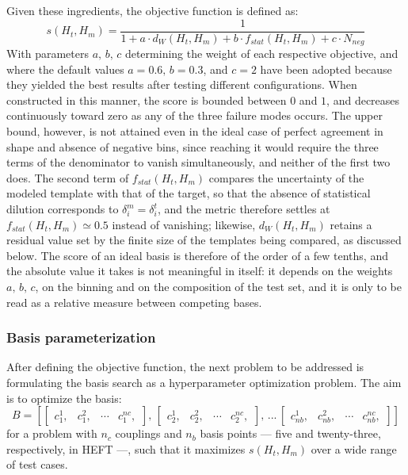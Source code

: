 Given these ingredients, the objective function is defined as:
\begin{equation}
\label{eq:scorefunc}
    s(H_{t},H_{m})=\frac{1}{1+a\cdot d_W(H_{t},H_{m}) + b\cdot f_{stat}(H_{t},H_{m}) + c\cdot N_{neg}}
\end{equation}
With parameters $a,\,b,\,c$ determining the weight of each respective objective, and where the default values $a=0.6,\,b=0.3$, and $c=2$ have been adopted because they yielded the best results after testing different configurations. When constructed in this manner, the score is bounded between $0$ and $1$, and decreases continuously toward zero as any of the three failure modes occurs. The upper bound, however, is not attained even in the ideal case of perfect agreement in shape and absence of negative bins, since reaching it would require the three terms of the denominator to vanish simultaneously, and neither of the first two does. The second term of $f_{stat}(H_{t},H_{m})$ compares the uncertainty of the modeled template with that of the target, so that the absence of statistical dilution corresponds to $\delta_i^{m}=\delta_i^{t}$, and the metric therefore settles at $f_{stat}(H_{t},H_{m})\simeq0.5$ instead of vanishing; likewise, $d_W(H_{t},H_{m})$ retains a residual value set by the finite size of the templates being compared, as discussed below. The score of an ideal basis is therefore of the order of a few tenths, and the absolute value it takes is not meaningful in itself: it depends on the weights $a,\,b,\,c$, on the binning and on the composition of the test set, and it is only to be read as a relative measure between competing bases.\\

\subsubsection{Basis parameterization}
%
After defining the objective function, the next problem to be addressed is formulating the basis search as a hyperparameter optimization problem. The aim is to optimize the basis:
%
\begin{equation}
 B=\left[ \begin{bmatrix}  c_1^{1},  & c_1^{2},  & \cdots & c_1^{nc}, \end{bmatrix},\, \begin{bmatrix}  c_2^{1},  & c_2^{2},  & \cdots & c_2^{nc},  \end{bmatrix},\, ...\, \begin{bmatrix}  c_{nb}^{1},  & c_{nb}^{2},  & \cdots & c_{nb}^{nc},  \end{bmatrix}\right]
 \label{eq:basicbasis}
\end{equation}
%
for a problem with $n_c$ couplings and $n_b$ basis points — five and twenty-three, respectively, in HEFT —, such that it maximizes $s(H_t,H_m)$ over a wide range of test cases.

